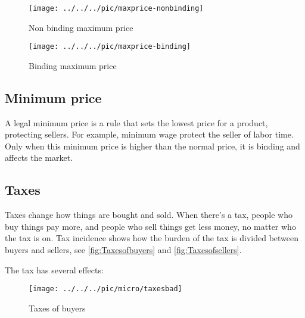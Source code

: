\begin{figure}\centering
	\texttt{[image: ../../../pic/maxprice-nonbinding]}
	\caption{Non binding maximum price}\label{fig:maxprice}
\end{figure}
\pbn

\begin{figure}\centering
	\texttt{[image: ../../../pic/maxprice-binding]}
	\caption{Binding maximum price}\label{fig:maxprice-binding}
\end{figure}

\subsection{Minimum price}

A legal minimum price is a rule that sets the lowest price for a product, protecting sellers. For example, minimum wage protect the seller of labor time. Only when this minimum price is higher than the normal price, it is binding and affects the market. 


\subsection{Taxes}

Taxes change how things are bought and sold. When there's a tax, people who buy things pay more, and people who sell things get less money, no matter who the tax is on. Tax incidence shows how the burden of the tax is divided between buyers and sellers, see \autoref{fig:Taxesofbuyers} and \autoref{fig:Taxesofsellers}.

\pbn
The tax has several effects:

\pbn

\begin{figure}
	\texttt{[image: ../../../pic/micro/taxesbad]}
	\caption{Taxes of buyers}\label{fig:Taxesofbuyers}
\end{figure}


